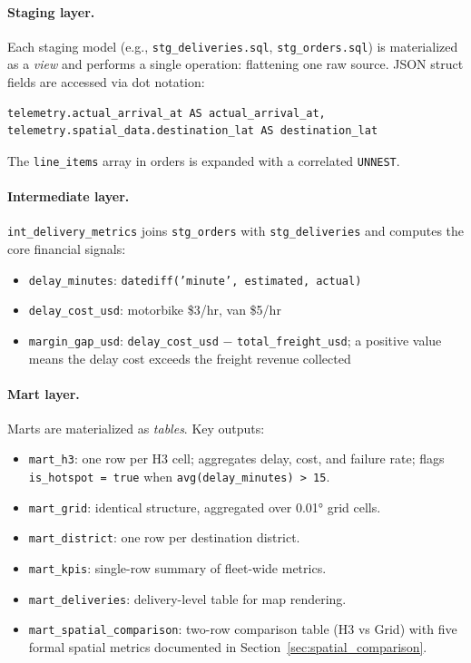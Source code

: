 \paragraph{Staging layer.}
Each staging model (e.g., \texttt{stg\_deliveries.sql}, \texttt{stg\_orders.sql}) is
materialized as a \emph{view} and performs a single operation: flattening one raw source.
JSON struct fields are accessed via dot notation:

\begin{verbatim}
telemetry.actual_arrival_at AS actual_arrival_at,
telemetry.spatial_data.destination_lat AS destination_lat
\end{verbatim}

The \texttt{line\_items} array in orders is expanded with a correlated \texttt{UNNEST}.

\paragraph{Intermediate layer.}
\texttt{int\_delivery\_metrics} joins \texttt{stg\_orders} with \texttt{stg\_deliveries}
and computes the core financial signals:

\begin{itemize}
  \item \texttt{delay\_minutes}: \texttt{datediff('minute', estimated, actual)}
  \item \texttt{delay\_cost\_usd}: motorbike \$3/hr, van \$5/hr
  \item \texttt{margin\_gap\_usd}: \texttt{delay\_cost\_usd} $-$ \texttt{total\_freight\_usd};
        a positive value means the delay cost exceeds the freight revenue collected
\end{itemize}

\paragraph{Mart layer.}
Marts are materialized as \emph{tables}. Key outputs:

\begin{itemize}
  \item \texttt{mart\_h3}: one row per H3 cell; aggregates delay, cost, and failure rate;
        flags \texttt{is\_hotspot = true} when \texttt{avg(delay\_minutes) > 15}.
  \item \texttt{mart\_grid}: identical structure, aggregated over 0.01° grid cells.
  \item \texttt{mart\_district}: one row per destination district.
  \item \texttt{mart\_kpis}: single-row summary of fleet-wide metrics.
  \item \texttt{mart\_deliveries}: delivery-level table for map rendering.
  \item \texttt{mart\_spatial\_comparison}: two-row comparison table (H3 vs Grid) with
        five formal spatial metrics documented in Section~\ref{sec:spatial_comparison}.
\end{itemize}

